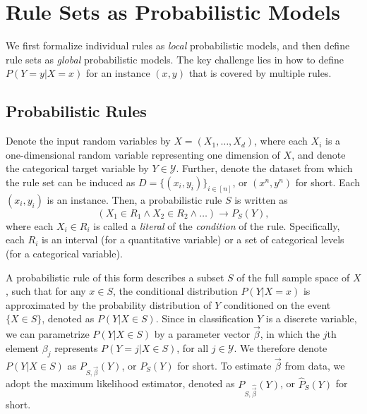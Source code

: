 \section{Rule Sets as Probabilistic Models}\label{section:rulesetModel}

We first formalize individual rules as \emph{local} probabilistic models, and then define rule sets as \emph{global} probabilistic models. The key challenge lies in how to define $P(Y=y|X=x)$ for an instance $(x,y)$ that is covered by multiple rules. 

\subsection{Probabilistic Rules}
Denote the input random variables by $X = (X_1, \ldots, X_d)$, where each $X_i$ is a one-dimensional random variable representing one dimension of $X$, and denote the categorical target variable by $Y\in\mathscr{Y}$. Further, denote the dataset from which the rule set can be induced as $D = \{(x_i, y_i)\}_{i \in [n]}$, or $(x^n, y^n)$ for short. Each $(x_i,y_i)$ is an instance. Then, a probabilistic rule $S$ is written as
\begin{equation}
(X_1 \in R_1 \land X_2 \in R_2 \land \ldots) \rightarrow P_S(Y),
\end{equation}
where each $X_i \in R_i$ is called a \emph{literal} of the \emph{condition} of the rule. Specifically, each $R_i$ is an interval (for a quantitative variable) or a set of categorical levels (for a categorical variable). 

A probabilistic rule of this form describes a subset $S$ of the full sample space of $X$, such that for any $x \in S$, the conditional distribution $P(Y | X=x)$ is approximated by the probability distribution of $Y$ conditioned on the event $\{X \in S\}$, denoted as $P(Y | X \in S)$. Since in classification $Y$ is a discrete variable, we can parametrize $P(Y|X\in S)$ by a parameter vector $\vec{\beta}$, in which the $j$th element $\beta_j$ represents $P(Y=j|X\in S)$, for all $j \in \mathscr{Y}$. We therefore denote $P(Y | X \in S)$ as $P_{S, \vec{\beta}}(Y)$, or $P_S(Y)$ for short. To estimate $\vec{\beta}$ from data, we adopt the maximum likelihood estimator, denoted as $P_{S, \hat{\vec{\beta}}}(Y)$, or $\hat{P}_S(Y)$ for short.

